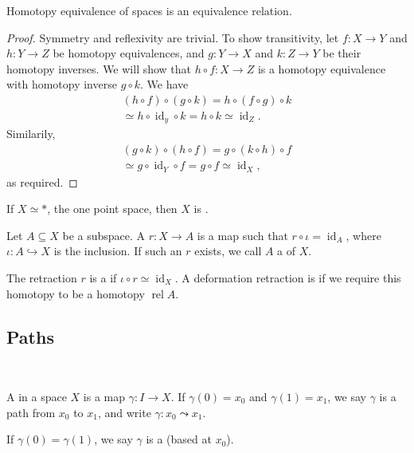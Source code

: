 \documentclass[a4paper, 10pt, twocolumn]{amsart}
\newcommand{\id}{\operatorname{id}}
\newcommand{\rel}{\operatorname{rel}}
\begin{document}
\begin{proposition}
  Homotopy equivalence of spaces is an equivalence relation.
\end{proposition}
\begin{proof}
  Symmetry and reflexivity are trivial. To show transitivity, let $f:X \rightarrow Y$ and $h: Y \rightarrow Z$ be homotopy equivalences, and $g: Y \rightarrow X$ and $k: Z \rightarrow Y$ be their homotopy inverses. We will show that $h \circ f : X \rightarrow Z$ is a homotopy equivalence with homotopy inverse $g \circ k$. We have
  \begin{align*}
  (h \circ f) \circ (g \circ k) = h \circ (f \circ g) \circ k \\
  \simeq h \circ \id_y \circ k = h \circ k \simeq \id_Z.
  \end{align*}
  Similarily,
  \begin{align*}
(g \circ k) \circ(h \circ f)=g \circ(k \circ h) \circ f \\
\simeq g \circ \operatorname{id}_Y \circ f=g \circ f \simeq \operatorname{id}_X,
  \end{align*}
  as required.
\end{proof}

\begin{definition}[Contractible]
  If $X \simeq *$, the one point space, then $X$ is .
\end{definition}

\begin{definition}[Retraction]
  Let $A \subseteq X$ be a subspace. A  $r:X \rightarrow A$ is a map such that $r \circ \iota = \id_A$, where $\iota: A \hookrightarrow X$ is the inclusion. If such an $r$ exists, we call $A$ a  of $X$.

  The retraction $r$ is a  if $\iota \circ r \simeq \id_X$. A deformation retraction is  if we require this homotopy to be a homotopy $\rel A$.
\end{definition}

\subsection{Paths}\ 

\begin{definition}[Path]
  A  in a space $X$ is a map $\gamma: I \rightarrow X$. 
  If $\gamma(0) = x_0$ and $\gamma(1) = x_1$, we say $\gamma$ is a path from $x_0$ to $x_1$, and write $\gamma: x_0 \leadsto x_1$. 
  
  If $\gamma(0) = \gamma(1)$, we say $\gamma$ is a  (based at $x_0$).
\end{definition}
\end{document}
